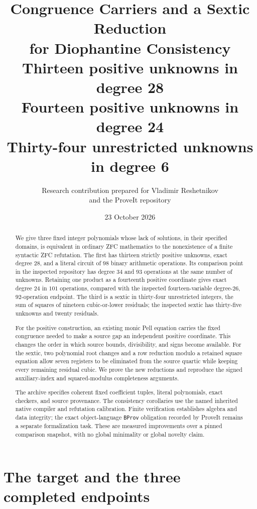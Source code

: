 \documentclass[11pt,a4paper]{article}
\title{\textbf{Congruence Carriers and a Sextic Reduction}\\[3pt]
  \textbf{for Diophantine Consistency}\\[8pt]
  \large Thirteen positive unknowns in degree 28\\
  Fourteen positive unknowns in degree 24\\
  Thirty-four unrestricted unknowns in degree 6}
\author{Research contribution prepared for Vladimir Reshetnikov\\
  and the ProveIt repository}
\date{23 October 2026}
\theoremstyle{definition}
\begin{document}
\maketitle

\begin{abstract}
We give three fixed integer polynomials whose lack of solutions, in their
specified domains, is equivalent in ordinary ZFC mathematics to the
nonexistence of a finite syntactic ZFC refutation.  The first has thirteen
strictly positive unknowns, exact degree \(28\), and a literal circuit of
\(98\) binary arithmetic operations.  Its comparison point in the inspected
repository has degree \(34\) and \(93\) operations at the same number of
unknowns.  Retaining one product as a fourteenth positive coordinate
gives exact degree \(24\) in \(101\) operations, compared with the inspected
fourteen-variable degree-\(26\), \(92\)-operation endpoint.
The third is a sextic in thirty-four unrestricted integers,
the sum of squares of nineteen cubic-or-lower residuals; the inspected
sextic has thirty-five unknowns and twenty residuals.

For the positive construction, an existing monic Pell equation carries
the fixed congruence needed to make a source gap an independent positive
coordinate.  This changes the order in which source bounds, divisibility,
and signs become available.  For the sextic, two polynomial root changes
and a row reduction modulo a retained square equation allow seven
registers to be eliminated from the source quartic while keeping every
remaining residual cubic.  We prove the new reductions and reproduce
the signed auxiliary-index and squared-modulus completeness arguments.

The archive specifies coherent fixed coefficient tuples, literal
polynomials, exact checkers, and source provenance.  The consistency
corollaries use the named inherited native compiler and refutation
calibration.  Finite verification establishes algebra and data integrity;
the exact object-language \texttt{BProv} obligation recorded by ProveIt
remains a separate formalization task.  These are measured improvements
over a pinned comparison snapshot, with no global minimality or global
novelty claim.
\end{abstract}

\clearpage
\tableofcontents
\newpage

\section{The target and the three completed endpoints}
\label{sec:target}
\end{document}
